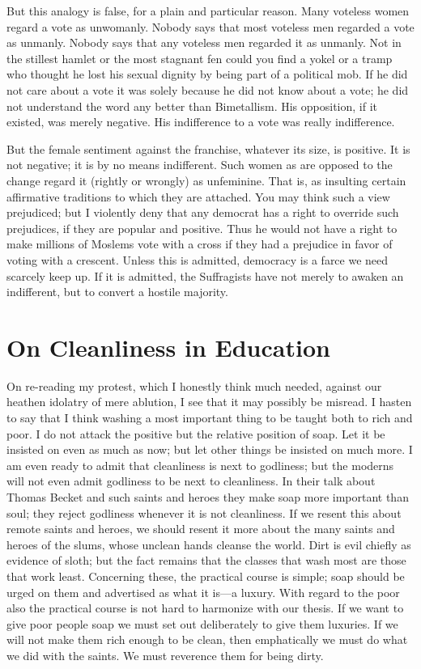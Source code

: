 \documentclass{book}
\begin{document}
But this analogy is false, for a plain and particular reason. Many voteless women regard a vote as unwomanly. Nobody says that most voteless men regarded a vote as unmanly. Nobody says that any voteless men regarded it as unmanly. Not in the stillest hamlet or the most stagnant fen could you find a yokel or a tramp who thought he lost his sexual dignity by being part of a political mob. If he did not care about a vote it was solely because he did not know about a vote; he did not understand the word any better than Bimetallism. His opposition, if it existed, was merely negative. His indifference to a vote was really indifference.

But the female sentiment against the franchise, whatever its size, is positive. It is not negative; it is by no means indifferent. Such women as are opposed to the change regard it (rightly or wrongly) as unfeminine. That is, as insulting certain affirmative traditions to which they are attached. You may think such a view prejudiced; but I violently deny that any democrat has a right to override such prejudices, if they are popular and positive. Thus he would not have a right to make millions of Moslems vote with a cross if they had a prejudice in favor of voting with a crescent. Unless this is admitted, democracy is a farce we need scarcely keep up. If it is admitted, the Suffragists have not merely to awaken an indifferent, but to convert a hostile majority.

\chapter{On Cleanliness in Education}
\label{chapter-54}
On re-reading my protest, which I honestly think much needed, against our heathen idolatry of mere ablution, I see that it may possibly be misread. I hasten to say that I think washing a most important thing to be taught both to rich and poor. I do not attack the positive but the relative position of soap. Let it be insisted on even as much as now; but let other things be insisted on much more. I am even ready to admit that cleanliness is next to godliness; but the moderns will not even admit godliness to be next to cleanliness. In their talk about Thomas Becket and such saints and heroes they make soap more important than soul; they reject godliness whenever it is not cleanliness. If we resent this about remote saints and heroes, we should resent it more about the many saints and heroes of the slums, whose unclean hands cleanse the world. Dirt is evil chiefly as evidence of sloth; but the fact remains that the classes that wash most are those that work least. Concerning these, the practical course is simple; soap should be urged on them and advertised as what it is—a luxury. With regard to the poor also the practical course is not hard to harmonize with our thesis. If we want to give poor people soap we must set out deliberately to give them luxuries. If we will not make them rich enough to be clean, then emphatically we must do what we did with the saints. We must reverence them for being dirty.
\end{document}
